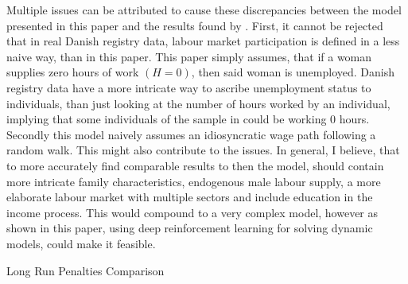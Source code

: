Multiple issues can be attributed to cause these discrepancies between the model presented in this paper and the results found by \textcite{kleven_children_2019}. First, it cannot be rejected that in real Danish registry data, labour market participation is defined in a less naive way, than in this paper. This paper simply assumes, that if a woman supplies zero hours of work $(H=0)$, then said woman is unemployed. Danish registry data have a more intricate way to ascribe unemployment status to individuals, than just looking at the number of hours worked by an individual, implying that some individuals of the sample in \textcite{kleven_children_2019} could be working 0 hours. Secondly this model naively assumes an idiosyncratic wage path following a random walk. This might also contribute to the issues. In general, I believe, that to more accurately find comparable results to \textcite{kleven_children_2019} then the model, should contain more intricate family characteristics, endogenous male labour supply, a more elaborate labour market with multiple sectors and include education in the income process. This would compound to a very complex model, however as shown in this paper, using deep reinforcement learning for solving dynamic models, could make it feasible.

\begin{table}[ht]
    \centering
    
    \caption{Long Run Penalties Comparison}
    \label{tab:extended_results}
\end{table}




